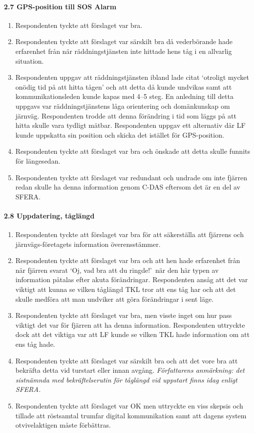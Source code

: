 \paragraph{2.7 GPS-position till SOS Alarm}
\begin{enumerate}
    \item Respondenten tyckte att förslaget var bra.
    \item Respondenten tyckte att förslaget var särskilt bra då vederbörande hade erfarenhet från när räddningstjänsten inte hittade hens tåg i en allvarlig situation.
    \item Respondenten uppgav att räddningstjänsten ibland lade citat \lq{}otroligt mycket onödig tid på att hitta tågen\rq{} och att detta då kunde undvikas samt att kommunikationsleden kunde kapas med 4--5 steg.
    En anledning till detta uppgavs var räddningstjänstens låga orientering och domänkunskap om järnväg.
    Respondenten trodde att denna förändring i tid som läggs på att hitta skulle vara tydligt mätbar.
    Respondenten uppgav ett alternativ där LF kunde uppskatta sin position och skicka det istället för GPS-position.
    \item Respondenten tyckte att förslaget var bra och önskade att detta skulle funnits för längesedan.
    \item Respondenten tyckte att förslaget var redundant och undrade om inte fjärren redan skulle ha denna information genom C-DAS eftersom det är en del av SFERA\@.
\end{enumerate}
\hspace{-12pt}
\paragraph{2.8 Uppdatering, tåglängd}
\begin{enumerate}
    \item Respondenten tyckte att förslaget var bra för att säkerställa att fjärrens och järnvägs-företagets information överensstämmer.
    \item Respondenten tyckte att förslaget var bra och att hen hade erfarenhet från när fjärren svarat \lq{}Oj, vad bra att du ringde!\rq{}~när den här typen av information påtalas efter akuta förändringar.
    Respondenten ansåg att det var viktigt att kunna se vilken tåglängd TKL tror att ens tåg har och att det skulle medföra att man undviker att göra förändringar i sent läge.
    \item Respondenten tyckte att förslaget var bra, men visste inget om hur pass viktigt det var för fjärren att ha denna information.
    Respondenten uttryckte dock att det viktiga var att LF kunde se vilken TKL hade information om att ens tåg hade.
    \item Respondenten tyckte att förslaget var särskilt bra och att det vore bra att bekräfta detta vid turstart eller innan avgång.
    \emph{Författarens anmärkning: det sistnämnda med bekräftelserutin för tåglängd vid uppstart finns idag enligt SFERA\@.}
    \item Respondenten tyckte att förslaget var OK men uttryckte en viss skepsis och tillade att röstsamtal trumfar digital kommunikation samt att dagens system otvivelaktigen måste förbättras.
\end{enumerate}
\hspace{-12pt}
